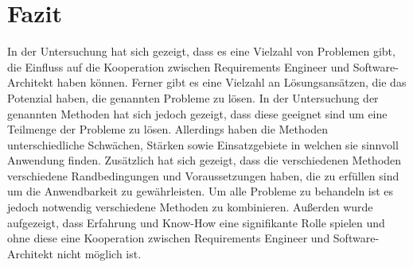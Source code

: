 \section{Fazit}
In der Untersuchung hat sich gezeigt, dass es eine Vielzahl von Problemen gibt, die Einfluss auf die Kooperation zwischen Requirements Engineer und Software-Architekt haben k\"onnen. Ferner gibt es eine Vielzahl an L\"osungsans\"atzen, die das Potenzial haben, die genannten Probleme zu l\"osen. In der Untersuchung der genannten Methoden hat sich jedoch gezeigt, dass diese geeignet sind um eine Teilmenge der Probleme zu l\"osen. Allerdings haben die Methoden unterschiedliche Schw\"achen, St\"arken sowie Einsatzgebiete in welchen sie sinnvoll Anwendung finden. Zus\"atzlich hat sich gezeigt, dass die verschiedenen Methoden verschiedene Randbedingungen und Voraussetzungen haben, die zu erf\"ullen sind um die Anwendbarkeit zu gew\"ahrleisten. Um alle Probleme zu behandeln ist es jedoch notwendig verschiedene Methoden zu kombinieren. Au\ss{}erden wurde aufgezeigt, dass Erfahrung und Know-How eine signifikante Rolle spielen und ohne diese eine Kooperation zwischen Requirements Engineer und Software-Architekt nicht m\"oglich ist. \\